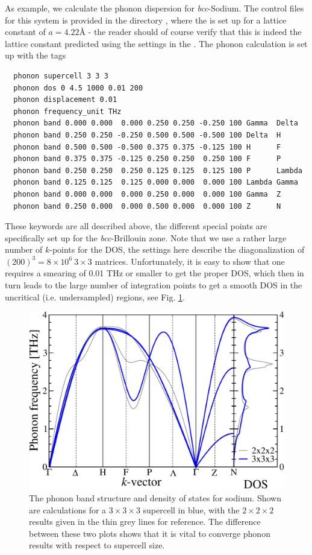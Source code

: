 As example, we calculate the phonon dispersion for
\emph{bcc}-Sodium. The control files for this system is provided in the
directory ,
where the  is set up for a lattice constant of
$a=4.22${\AA} - the reader should of course verify that this is indeed
the lattice constant predicted using the settings in the
. The phonon calculation is set up with the
tags 
\begin{verbatim}
  phonon supercell 3 3 3 
  phonon dos 0 4.5 1000 0.01 200
  phonon displacement 0.01
  phonon frequency_unit THz
  phonon band 0.000 0.000  0.000 0.250 0.250 -0.250 100 Gamma  Delta
  phonon band 0.250 0.250 -0.250 0.500 0.500 -0.500 100 Delta  H
  phonon band 0.500 0.500 -0.500 0.375 0.375 -0.125 100 H      F
  phonon band 0.375 0.375 -0.125 0.250 0.250  0.250 100 F      P
  phonon band 0.250 0.250  0.250 0.125 0.125  0.125 100 P      Lambda
  phonon band 0.125 0.125  0.125 0.000 0.000  0.000 100 Lambda Gamma
  phonon band 0.000 0.000  0.000 0.250 0.000  0.000 100 Gamma  Z
  phonon band 0.250 0.000  0.000 0.500 0.000  0.000 100 Z      N
\end{verbatim} 
These keywords are all described above, the different special points
are specifically set up for the \emph{bcc}-Brillouin zone. Note that we use a rather
large number of $k$-points for the DOS, the settings here describe the
diagonalization of $(200)^3=8\times10^6\ 3\times3$
matrices. Unfortunately, it is easy to show that one requires a
smearing of 0.01 THz or smaller to get the proper DOS, which then in
turn leads to the large number of integration points to get a smooth
DOS in the uncritical (i.e. undersampled) regions, see
Fig. \ref{sodium phonon figure}. 

\begin{figure}
\begin{center}
\includegraphics[height=7 cm]{Na_phonons}
\end{center}
\caption{The phonon band structure and density of states for
  sodium. Shown are calculations for a $3\times3\times3$ supercell in blue,
  with the $2\times2\times2$ results given in the thin grey lines for
  reference. The difference between these two plots shows that it is
  vital to converge phonon results with respect to supercell size.}
\label{sodium phonon figure}
\end{figure}

